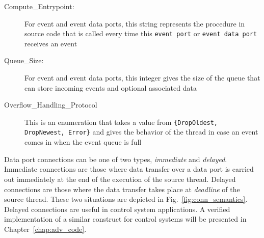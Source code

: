 \begin{description}
\item[Compute\_Entrypoint:]{For event and event data ports, this
  string represents the procedure in source code that is called every
  time this \texttt{event port} or \texttt{event data port} receives
  an event}
\item[Queue\_Size:]{For event and event data ports, this integer gives
  the size of the queue that can store incoming events and optional
  associated data}
\item[Overflow\_Handling\_Protocol]{This is an enumeration that takes
  a value from \texttt{\{DropOldest, DropNewest, Error\}} and gives the
  behavior of the thread in case an event comes in when the event
  queue is full}
\end{description}

Data port connections can be one of two types, \emph{immediate} and
\emph{delayed}. Immediate connections are those where data transfer
over a data port is carried out immediately at the end of the
execution of the source thread. Delayed connections are those where
the data transfer takes place at \emph{deadline} of the source
thread. These two situations are depicted in
Fig.~\ref{fig:conn_semantics}. Delayed connections are useful in
control system applications. A verified implementation of a similar
construct for control systems will be presented in
Chapter~\ref{chap:adv_code}.

